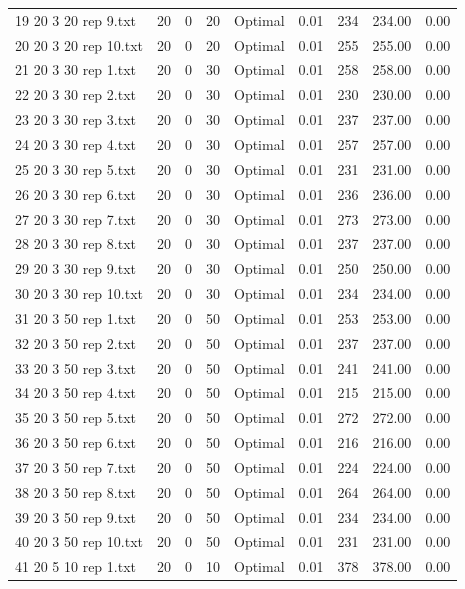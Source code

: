 \begin{longtable}{lrrllrrrr}
19 20 3 20 rep 9.txt & 20 & 0 & 20 & Optimal &  0.01 & 234 & 234.00 &  0.00\\
20 20 3 20 rep 10.txt & 20 & 0 & 20 & Optimal &  0.01 & 255 & 255.00 &  0.00\\
21 20 3 30 rep 1.txt & 20 & 0 & 30 & Optimal &  0.01 & 258 & 258.00 &  0.00\\
22 20 3 30 rep 2.txt & 20 & 0 & 30 & Optimal &  0.01 & 230 & 230.00 &  0.00\\
23 20 3 30 rep 3.txt & 20 & 0 & 30 & Optimal &  0.01 & 237 & 237.00 &  0.00\\
24 20 3 30 rep 4.txt & 20 & 0 & 30 & Optimal &  0.01 & 257 & 257.00 &  0.00\\
25 20 3 30 rep 5.txt & 20 & 0 & 30 & Optimal &  0.01 & 231 & 231.00 &  0.00\\
26 20 3 30 rep 6.txt & 20 & 0 & 30 & Optimal &  0.01 & 236 & 236.00 &  0.00\\
27 20 3 30 rep 7.txt & 20 & 0 & 30 & Optimal &  0.01 & 273 & 273.00 &  0.00\\
28 20 3 30 rep 8.txt & 20 & 0 & 30 & Optimal &  0.01 & 237 & 237.00 &  0.00\\
29 20 3 30 rep 9.txt & 20 & 0 & 30 & Optimal &  0.01 & 250 & 250.00 &  0.00\\
30 20 3 30 rep 10.txt & 20 & 0 & 30 & Optimal &  0.01 & 234 & 234.00 &  0.00\\
31 20 3 50 rep 1.txt & 20 & 0 & 50 & Optimal &  0.01 & 253 & 253.00 &  0.00\\
32 20 3 50 rep 2.txt & 20 & 0 & 50 & Optimal &  0.01 & 237 & 237.00 &  0.00\\
33 20 3 50 rep 3.txt & 20 & 0 & 50 & Optimal &  0.01 & 241 & 241.00 &  0.00\\
34 20 3 50 rep 4.txt & 20 & 0 & 50 & Optimal &  0.01 & 215 & 215.00 &  0.00\\
35 20 3 50 rep 5.txt & 20 & 0 & 50 & Optimal &  0.01 & 272 & 272.00 &  0.00\\
36 20 3 50 rep 6.txt & 20 & 0 & 50 & Optimal &  0.01 & 216 & 216.00 &  0.00\\
37 20 3 50 rep 7.txt & 20 & 0 & 50 & Optimal &  0.01 & 224 & 224.00 &  0.00\\
38 20 3 50 rep 8.txt & 20 & 0 & 50 & Optimal &  0.01 & 264 & 264.00 &  0.00\\
39 20 3 50 rep 9.txt & 20 & 0 & 50 & Optimal &  0.01 & 234 & 234.00 &  0.00\\
40 20 3 50 rep 10.txt & 20 & 0 & 50 & Optimal &  0.01 & 231 & 231.00 &  0.00\\
41 20 5 10 rep 1.txt & 20 & 0 & 10 & Optimal &  0.01 & 378 & 378.00 &  0.00\\

\end{longtable}
